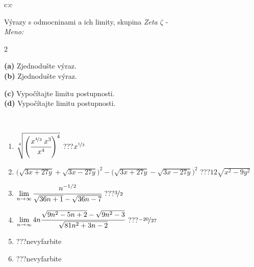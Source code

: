 \documentclass[10pt]{report}
\begin{document}
\begin{tabular}{c:c}
\begin{minipage}[c][104.5mm][t]{0.5\linewidth}
\begin{center}
\vspace{7mm}
{\huge {\Large Výrazy s odmocninami a ich limity}, skupina \textit{Zeta $\zeta$} -}\\[5mm]
\textit{Meno:}\phantom{xxxxxxxxxxxxxxxxxxxxxxxxxxxxxxxxxxxxxxxxxxxxxxxxxxxxxxxxxxxxxxxxx}\\[5mm]
\begin{minipage}{0.95\linewidth}
\begin{center}
{\small \begin{multicols}{2} \raggedright
\phantom{xxxxxxxxx}\textbf{(a)} Zjednodušte výraz. \\[1mm]
\phantom{xxxxxxxxx}\textbf{(b)} Zjednodušte výraz. \par \columnbreak
\textbf{(c)} Vypočítajte limitu postupnosti. \\[1mm]
\textbf{(d)} Vypočítajte limitu postupnosti.
\end{multicols}
}
\end{center}
\end{minipage}
\\[4mm]
\begin{minipage}{0.79\linewidth}
\begin{center}
\begin{varwidth}{\linewidth}
\begin{enumerate}
\small
\item $\sqrt[4]{\left(\cfrac{x^{\nicefrac{4}{3}}\;x^{3}}{x^{4}}\right)^{4}}$\quad \dotfill\; ???\;\dotfill \quad $x^{\nicefrac{1}{3}}$
\item {\footnotesize{\scriptsize$\big(\sqrt{3x+27y}+\sqrt{3x-27y}\big)^2-\big(\sqrt{3x+27y}-\sqrt{3x-27y}\big)^2$}\quad \dotfill\; ???\;\dotfill \quad $12\sqrt{x^2-9y^2}$}
\item $\lim\limits_{n\to\infty}\cfrac{n^{-1/2}}{\sqrt{36n+1}-\sqrt{36n-7}}$\quad \dotfill\; ???\;\dotfill \quad $\nicefrac{3}{2}$
\item $\lim\limits_{n\to\infty}4n\cfrac{\sqrt{9n^2-5n+2}-\sqrt{9n^2-3}}{\sqrt{81n^2+3n-2}}$\quad \dotfill\; ???\;\dotfill \quad $\nicefrac{-20}{27}$
\item \quad \dotfill\; ???\;\dotfill \quad nevyfarbite
\item \quad \dotfill\; ???\;\dotfill \quad nevyfarbite
\end{enumerate}
\end{varwidth}

\end{center}
\end{minipage}
\end{center}
\end{minipage}
\end{tabular}
\end{document}
